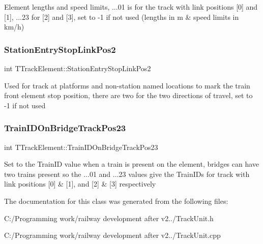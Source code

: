 Element lengths and speed limits, ...01 is for the track with link positions \mbox{[}0\mbox{]} and \mbox{[}1\mbox{]}, ...23 for \mbox{[}2\mbox{]} and \mbox{[}3\mbox{]}, set to -\/1 if not used (lengths in m \& speed limits in km/h) \mbox{\label{class_t_track_element_af6b589b13c3b59adb3c493816316ffe1}} 
\subsubsection{\texorpdfstring{Station\+Entry\+Stop\+Link\+Pos2}{StationEntryStopLinkPos2}}
{\footnotesize\ttfamily int T\+Track\+Element\+::\+Station\+Entry\+Stop\+Link\+Pos2}

Used for track at platforms and non-\/station named locations to mark the train front element stop position, there are two for the two directions of travel, set to -\/1 if not used \mbox{\label{class_t_track_element_aa3d8b1fef605f7ef4e6b09360abbb528}} 
\subsubsection{\texorpdfstring{Train\+I\+D\+On\+Bridge\+Track\+Pos23}{TrainIDOnBridgeTrackPos23}}
{\footnotesize\ttfamily int T\+Track\+Element\+::\+Train\+I\+D\+On\+Bridge\+Track\+Pos23}

Set to the Train\+ID value when a train is present on the element, bridges can have two trains present so the ...01 and ...23 values give the Train\+I\+Ds for track with link positions \mbox{[}0\mbox{]} \& \mbox{[}1\mbox{]}, and \mbox{[}2\mbox{]} \& \mbox{[}3\mbox{]} respectively 

The documentation for this class was generated from the following files\+:\begin{DoxyCompactItemize}
\item 
C\+:/\+Programming work/railway development after v2../Track\+Unit.\+h\item 
C\+:/\+Programming work/railway development after v2../Track\+Unit.\+cpp\end{DoxyCompactItemize}
